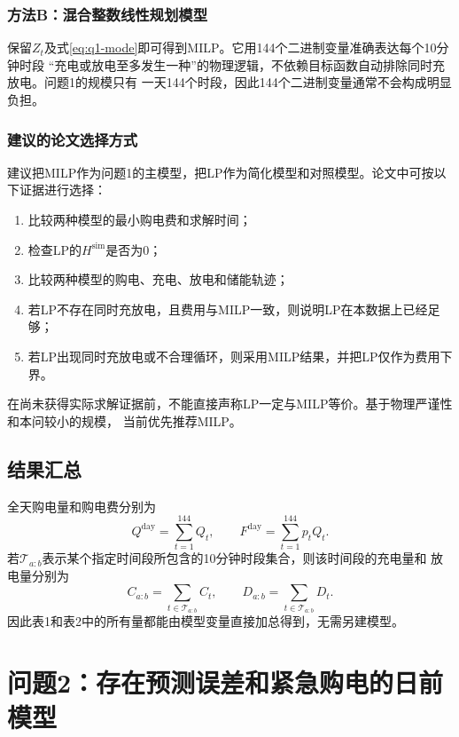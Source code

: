 \documentclass[UTF8,11pt]{ctexart}
\begin{document}
\subsubsection{方法B：混合整数线性规划模型}

保留$Z_t$及式\eqref{eq:q1-mode}即可得到MILP。它用144个二进制变量准确表达每个10分钟时段
“充电或放电至多发生一种”的物理逻辑，不依赖目标函数自动排除同时充放电。问题1的规模只有
一天144个时段，因此144个二进制变量通常不会构成明显负担。

\subsubsection{建议的论文选择方式}

建议把MILP作为问题1的主模型，把LP作为简化模型和对照模型。论文中可按以下证据进行选择：
\begin{enumerate}[label=(\arabic*)]
    \item 比较两种模型的最小购电费和求解时间；
    \item 检查LP的$H^{\mathrm{sim}}$是否为0；
    \item 比较两种模型的购电、充电、放电和储能轨迹；
    \item 若LP不存在同时充放电，且费用与MILP一致，则说明LP在本数据上已经足够；
    \item 若LP出现同时充放电或不合理循环，则采用MILP结果，并把LP仅作为费用下界。
\end{enumerate}
在尚未获得实际求解证据前，不能直接声称LP一定与MILP等价。基于物理严谨性和本问较小的规模，
当前优先推荐MILP。

\subsection{结果汇总}

全天购电量和购电费分别为
\begin{equation}
    Q^{\mathrm{day}}=\sum_{t=1}^{144}Q_t,
    \qquad
    F^{\mathrm{day}}=\sum_{t=1}^{144}p_tQ_t.
\end{equation}
若$\mathcal{T}_{a:b}$表示某个指定时间段所包含的10分钟时段集合，则该时间段的充电量和
放电量分别为
\begin{equation}
    C_{a:b}=\sum_{t\in\mathcal{T}_{a:b}}C_t,
    \qquad
    D_{a:b}=\sum_{t\in\mathcal{T}_{a:b}}D_t.
\end{equation}
因此表1和表2中的所有量都能由模型变量直接加总得到，无需另建模型。

\section{问题2：存在预测误差和紧急购电的日前模型}
\end{document}
